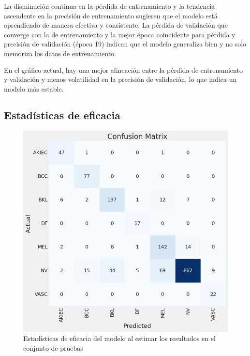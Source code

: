 La disminución continua en la pérdida de entrenamiento y la tendencia ascendente en la precisión de entrenamiento sugieren que el modelo está aprendiendo de manera efectiva y consistente. La pérdida de validación que converge con la de entrenamiento y la mejor época coincidente para pérdida y precisión de validación (época 19) indican que el modelo generaliza bien y no solo memoriza los datos de entrenamiento.

En el gráfico actual, hay una mejor alineación entre la pérdida de entrenamiento y validación y menos volatilidad en la precisión de validación, lo que indica un modelo más estable.

	\subsection{Estadísticas de eficacia}\label{sub:accuracy_statistic_p2}
    
\begin{figure}[ht]%
   \begin{center}
   \includegraphics[width=1\textwidth]{./Graphics/confussionMatrix_p3.png}
   \caption{Estadísticas de eficacia del modelo al estimar los resultados en el conjunto de pruebas\label{fig:confussion_matrix_p3}}
   \end{center}
   \end{figure}

